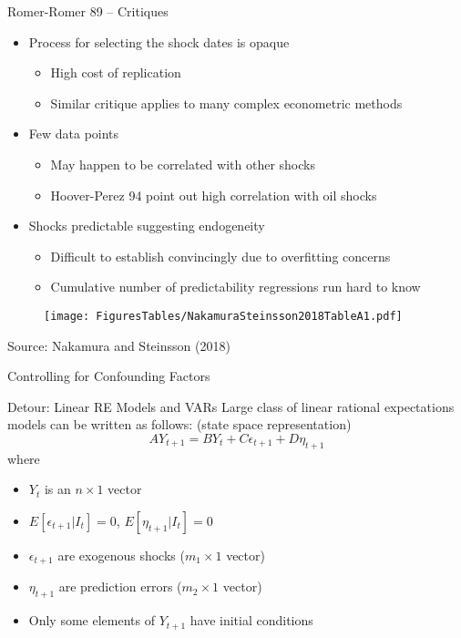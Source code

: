 \documentclass[11pt,aspectratio=169,xcolor={dvipsnames},hyperref={pdftex,pdfpagemode=UseNone,hidelinks,pdfdisplaydoctitle=true},usepdftitle=false]{beamer}
\begin{document}
\begin{frame}{Romer-Romer 89 -- Critiques}
\begin{itemize}
\itemsep1em 
\item Process for selecting the shock dates is opaque
\begin{itemize}
\item High cost of replication
\item Similar critique applies to many complex econometric methods
\end{itemize}
\item Few data points
\begin{itemize}
\item May happen to be correlated with other shocks
\item Hoover-Perez 94 point out high correlation with oil shocks
\end{itemize}
\item Shocks predictable suggesting endogeneity
\begin{itemize}
\item Difficult to establish convincingly due to overfitting concerns
\item Cumulative number of predictability regressions run hard to know
\end{itemize}
\end{itemize}
\end{frame}


\begin{frame}
\begin{figure}
\centering
\texttt{[image: FiguresTables/NakamuraSteinsson2018TableA1.pdf]}
\end{figure}
\vspace{-15pt}
{\scriptsize Source: Nakamura and Steinsson (2018)}
\end{frame}


{  
	\begin{frame}
		\addtocounter{framenumber}{-1}
		\thispagestyle{empty}		
		\begin{center}
			{\Large Controlling for Confounding Factors}
		\end{center}	
	\end{frame}
}


\begin{frame}{Detour: Linear RE Models and VARs}
Large class of linear rational expectations models can be written as follows: (state space representation)
\[ A Y_{t+1} = B Y_{t} + C \epsilon_{t+1} + D \eta_{t+1} \]
where 
\begin{itemize}
\item $Y_{t}$ is an $n \times 1$ vector
\item $E[\epsilon_{t+1} | I_{t} ] = 0$, $E[\eta_{t+1} | I_{t} ] = 0$
\item $\epsilon_{t+1}$ are exogenous shocks ($m_1 \times 1$ vector)
\item $\eta_{t+1}$ are prediction errors ($m_2 \times 1$ vector)
\item Only some elements of $Y_{t+1}$ have initial conditions
\end{itemize}
\end{frame}
\end{document}
